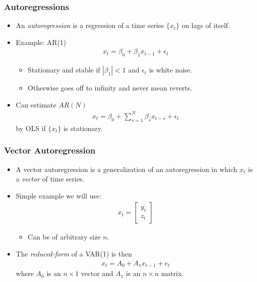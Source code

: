 \documentclass[english,xcolor=svgnames]{beamer}
\begin{document}
\begin{frame}
\frametitle{Autoregressions}
\begin{itemize}
	\item An \emph{autoregression} is a regression of a time series $\{x_t\}$ on lags of itself.
	\item Example: AR(1)
	\begin{align*}
		x_t = \beta_0+\beta_1x_{t-1}+\epsilon_t
	\end{align*}
\begin{itemize}
	\item Stationary and stable if $|\beta_1|< 1$ and $\epsilon_t$ is white noise.
	\item Otherwise goes off to infinity and never mean reverts.
	\end{itemize}
	\item Can estimate $AR(N)$
	\begin{align*}
		x_t = \beta_0+\sum_{s=1}^{N}\beta_s x_{t-s}+\epsilon_t
	\end{align*}
	by OLS if $\{x_t\}$ is stationary.
\end{itemize}
\end{frame}


\begin{frame}
\frametitle{Vector Autoregression}
\begin{itemize}
	\item A vector autoregression is a generalization of an autoregression in which $x_t$ is a \emph{vector} of time series.
	\item Simple example we will use:
	\begin{align*}
		x_t = \left[\begin{matrix}y_t \\ z_t\end{matrix}\right]
	\end{align*}
	\begin{itemize}
		\item Can be of arbitrary size $n$.
	\end{itemize}
	\item The \emph{reduced-form} of a VAR(1) is then
	\begin{align*}
		x_t = A_0+A_1 x_{t-1}+e_t
	\end{align*}
	where $A_0$ is an $n\times1$ vector and $A_1$ is an $n\times n$ matrix.
\end{itemize}
\end{frame}
\end{document}
